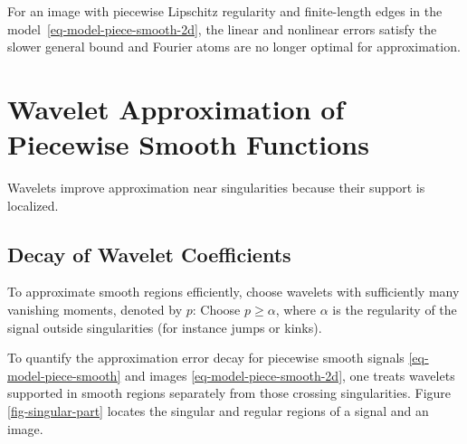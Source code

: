 For an image with piecewise Lipschitz regularity and finite-length edges in the model~\eqref{eq-model-piece-smooth-2d}, the linear and nonlinear errors satisfy the slower general bound
and Fourier atoms are no longer optimal for approximation.


                                        
                                        
\section{Wavelet Approximation of Piecewise Smooth Functions}

Wavelets improve approximation near singularities because their support is localized.

                                        
\subsection{Decay of Wavelet Coefficients}
\label{subsect-wavdecay}

To approximate smooth regions efficiently, choose wavelets with sufficiently many vanishing moments, denoted by $p$:
Choose $p\geq\alpha$, where $\alpha$ is the regularity of the signal outside singularities (for instance jumps or kinks).


To quantify the approximation error decay for piecewise smooth signals \eqref{eq-model-piece-smooth} and images \eqref{eq-model-piece-smooth-2d}, one treats wavelets supported in smooth regions separately from those crossing singularities. Figure \ref{fig-singular-part} locates the singular and regular regions of a signal and an image.

